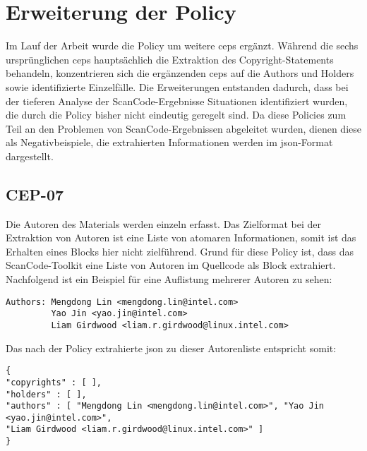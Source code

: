 

\section{Erweiterung der Policy}\label{sec:extended-policy}

Im Lauf der Arbeit wurde die Policy um weitere \glspl{cep} ergänzt.
Während die sechs ursprünglichen \glspl{cep} hauptsächlich die Extraktion des Copyright-Statements behandeln, konzentrieren sich die ergänzenden \glspl{cep} auf die Authors und Holders sowie identifizierte Einzelfälle.
Die Erweiterungen entstanden dadurch, dass bei der tieferen Analyse der ScanCode-Ergebnisse Situationen identifiziert wurden, die durch die Policy bisher nicht eindeutig geregelt sind.
Da diese Policies zum Teil an den Problemen von ScanCode-Ergebnissen abgeleitet wurden, dienen diese als Negativbeispiele, die extrahierten Informationen werden im \gls{json}-Format dargestellt.


\subsection{CEP-07}\label{subsec:cep-07}

Die Autoren des Materials werden einzeln erfasst.
Das Zielformat bei der Extraktion von Autoren ist eine Liste von atomaren Informationen, somit ist das Erhalten eines Blocks hier nicht zielführend.
Grund für diese Policy ist, dass das ScanCode-Toolkit eine Liste von Autoren im Quellcode als Block extrahiert.
Nachfolgend ist ein Beispiel für eine Auflistung mehrerer Autoren zu sehen:

\begin{lstlisting}[numbers=none, keepspaces=true]
Authors: Mengdong Lin <mengdong.lin@intel.com>
         Yao Jin <yao.jin@intel.com>
         Liam Girdwood <liam.r.girdwood@linux.intel.com>
\end{lstlisting}

Das nach der Policy extrahierte \gls{json} zu dieser Autorenliste entspricht somit:

\begin{lstlisting}[numbers=none, keepspaces=true]
{
"copyrights" : [ ],
"holders" : [ ],
"authors" : [ "Mengdong Lin <mengdong.lin@intel.com>", "Yao Jin <yao.jin@intel.com>",
"Liam Girdwood <liam.r.girdwood@linux.intel.com>" ]
}
\end{lstlisting}

